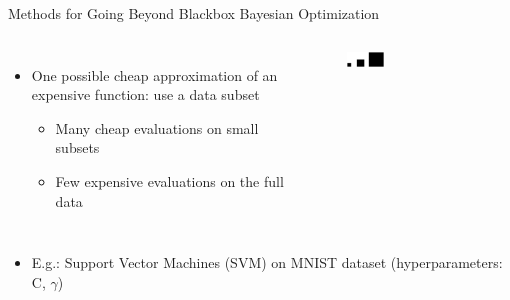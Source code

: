 \begin{frame}[c]{Methods for Going Beyond Blackbox Bayesian Optimization}

\begin{columns}

    \begin{itemize}
        \item One possible cheap approximation of an expensive function: use a data subset
        \begin{itemize}
            \item Many cheap evaluations on small subsets
            \item Few expensive evaluations on the full data
        \end{itemize}
    \end{itemize}
    
    \begin{figure}
        \centering
        \includegraphics[width=0.3\textwidth]{w07_hpo_grey_box/images/intro/black_blocks.png}
    \end{figure}

\end{columns}

\begin{itemize}
    \item E.g.: Support Vector Machines (SVM) on MNIST dataset (hyperparameters: C, $\gamma$)
\end{itemize}



\vskip -15pt


\end{frame}

